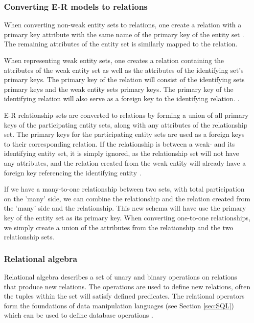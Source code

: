 \subsubsection*{Converting E-R models to relations}
When converting non-weak entity sets to relations, one create a relation with a primary key attribute with the same name of the primary key of the entity set \cite[Chapter 6.7.1]{DBSBook}.
The remaining attributes of the entity set is similarly mapped to the relation. 

When representing weak entity sets, one creates a relation containing the attributes of the weak entity set as well as the attributes of the identifying set's primary keys. 
The primary key of the relation will consist of the identifying sets primary keys and the weak entity sets primary keys. 
The primary key of the identifying relation will also serve as a foreign key to the identifying relation.  \cite[Chapter 6.7.1]{DBSBook}.

E-R relationship sets are converted to relations by forming a union of all primary keys of the participating entity sets, along with any attributes of the relationship set. 
The primary keys for the participating entity sets are used as a foreign keys to their corresponding relation.
If the relationship is between a weak- and its identifying entity set, it is simply ignored, as the relationship set will not have any attributes, and the relation created from the weak entity will already have a foreign key referencing the identifying entity \cite[Chapter 6.7.5]{DBSBook}. 

If we have a many-to-one relationship between two sets, with total participation on the 'many' side, we can combine the relationship and the relation created from the 'many' side and the relationship.
This new schema will have use the primary key of the entity set as its primary key.
When converting one-to-one relationships, we simply create a union of the attributes from the relationship and the two relationship sets. \cite*[Chapter 6.7.6]{DBSBook}

\subsubsection{Relational algebra}\label{sec:relationalAlgebra}
Relational algebra describes a set of unary and binary operations on relations that produce new relations.
The operations are used to define new relations, often the tuples within the set will satisfy defined predicates.
The relational operators form the foundations of data manipulation languages (see Section \ref{sec:SQL}) which can be used to define database operations \cite[Chapter 6.2]{DBSBook}.


